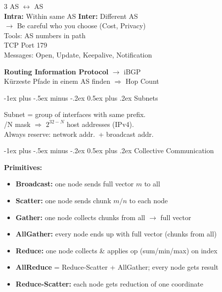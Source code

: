 \documentclass[10pt,landscape]{article}
\makeatletter
\renewcommand{\section}{\@startsection{section}{1}{0mm}%
                                {-1ex plus -.5ex minus -.2ex}%
                                {0.5ex plus .2ex}%
                                {\normalfont\large\bfseries}}
\makeatother
\begin{document}
\begin{multicols}{3}
AS $\leftrightarrow$ AS\\
\textbf{Intra:} Within same AS \quad \textbf{Inter:} Different AS\\
$\rightarrow$ Be careful who you choose (Cost, Privacy)\\
Tools: AS numbers in path\\
TCP Port 179\\
Messages: Open, Update, Keepalive, Notification

\textbf{Routing Information Protocol} $\rightarrow$ iBGP\\
Kürzeste Pfade in einem AS finden $\Rightarrow$ Hop Count

\section{Subnets}

Subnet = group of interfaces with same prefix.\\
/N mask $\Rightarrow$ $2^{32-N}$ host addresses (IPv4).\\
Always reserve: network addr.\ + broadcast addr.

\section{Collective Communication}

\textbf{Primitives:}
\begin{itemize}\setlength\itemsep{0pt}
  \item \textbf{Broadcast:} one node sends full vector $m$ to all
  \item \textbf{Scatter:} one node sends chunk $m/n$ to each node
  \item \textbf{Gather:} one node collects chunks from all $\rightarrow$ full vector
  \item \textbf{AllGather:} every node ends up with full vector (chunks from all)
  \item \textbf{Reduce:} one node collects \& applies op (sum/min/max) on index
  \item \textbf{AllReduce} = Reduce-Scatter + AllGather; every node gets result
  \item \textbf{Reduce-Scatter:} each node gets reduction of one coordinate
\end{itemize}


\end{multicols}
\end{document}
